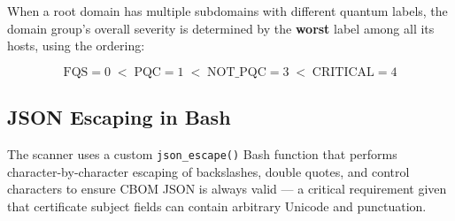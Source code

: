When a root domain has multiple subdomains with different quantum labels,
the domain group's overall severity is determined by the \textbf{worst}
label among all its hosts, using the ordering:

\[
  \text{FQS} = 0 \;<\; \text{PQC} = 1 \;<\; \text{NOT\_PQC} = 3 \;<\;
  \text{CRITICAL} = 4
\]

\subsection{JSON Escaping in Bash}

The scanner uses a custom \texttt{json\_escape()} Bash function that
performs character-by-character escaping of backslashes, double quotes,
and control characters to ensure CBOM JSON is always valid — a critical
requirement given that certificate subject fields can contain arbitrary
Unicode and punctuation.
